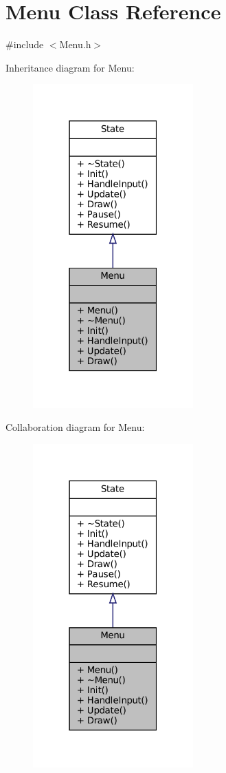 \hypertarget{classMenu}{}\section{Menu Class Reference}
\label{classMenu}


{\ttfamily \#include $<$Menu.\+h$>$}



Inheritance diagram for Menu\+:\nopagebreak
\begin{figure}[H]
\begin{center}
\leavevmode
\includegraphics[width=175pt]{classMenu__inherit__graph}
\end{center}
\end{figure}


Collaboration diagram for Menu\+:\nopagebreak
\begin{figure}[H]
\begin{center}
\leavevmode
\includegraphics[width=175pt]{classMenu__coll__graph}
\end{center}
\end{figure}
